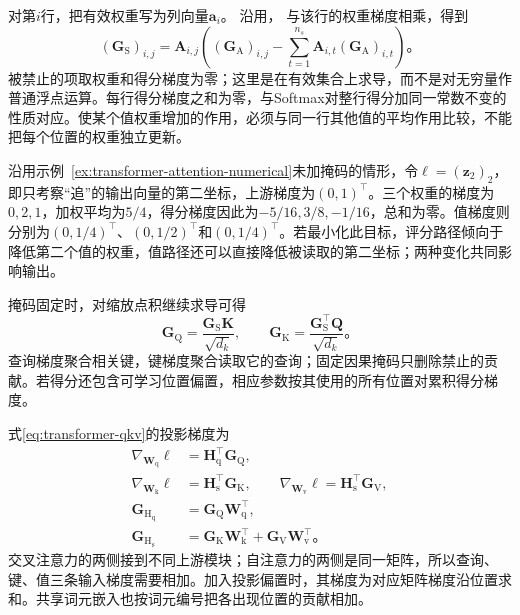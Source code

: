 对第$i$行，把有效权重写为列向量$\bm a_i$。
沿用，
与该行的权重梯度相乘，得到
\begin{equation}
  (\bm G_{\mathrm S})_{i,j}
   =\bm A_{i,j}\left((\bm G_{\mathrm A})_{i,j}
       -\sum_{t=1}^{n_s}\bm A_{i,t}(\bm G_{\mathrm A})_{i,t}\right)\text{。}
  \label{eq:transformer-softmax-gradient}
\end{equation}
被禁止的项取权重和得分梯度为零；这里是在有效集合上求导，而不是对无穷量作普通浮点运算。每行得分梯度之和为零，与Softmax对整行得分加同一常数不变的性质对应。使某个值权重增加的作用，必须与同一行其他值的平均作用比较，不能把每个位置的权重独立更新。

\Needspace{45mm}
\begin{example}[从聚合误差到评分误差]
  \label{ex:transformer-gradient-numerical}
  沿用示例~\ref{ex:transformer-attention-numerical}未加掩码的情形，令$\ell=(\bm z_2)_2$，即只考察“追”的输出向量的第二坐标，上游梯度为$(0,1)^{\top}$。三个权重的梯度为$0,2,1$，加权平均为$5/4$，得分梯度因此为$-5/16,3/8,-1/16$，总和为零。值梯度则分别为$(0,1/4)^{\top}$、$(0,1/2)^{\top}$和$(0,1/4)^{\top}$。若最小化此目标，评分路径倾向于降低第二个值的权重，值路径还可以直接降低被读取的第二坐标；两种变化共同影响输出。
\end{example}

掩码固定时，对缩放点积继续求导可得
\begin{equation}
  \bm G_{\mathrm Q}=\frac{\bm G_{\mathrm S}\bm K}{\sqrt{d_k}},\qquad
  \bm G_{\mathrm K}=\frac{\bm G_{\mathrm S}^{\top}\bm Q}{\sqrt{d_k}}\text{。}
  \label{eq:transformer-qk-gradient}
\end{equation}
查询梯度聚合相关键，键梯度聚合读取它的查询；固定因果掩码只删除禁止的贡献。若得分还包含可学习位置偏置，相应参数按其使用的所有位置对累积得分梯度。

式\eqref{eq:transformer-qkv}的投影梯度为
\begin{equation}
  \begin{aligned}
    \nabla_{\bm W_{\mathrm q}}\ell&=\bm H_{\mathrm q}^{\top}\bm G_{\mathrm Q},\\
    \nabla_{\bm W_{\mathrm k}}\ell&=\bm H_{\mathrm s}^{\top}\bm G_{\mathrm K},\qquad
    \nabla_{\bm W_{\mathrm v}}\ell=\bm H_{\mathrm s}^{\top}\bm G_{\mathrm V},\\
    \bm G_{\mathrm H_{\mathrm q}}&=\bm G_{\mathrm Q}\bm W_{\mathrm q}^{\top},\\
    \bm G_{\mathrm H_{\mathrm s}}&=\bm G_{\mathrm K}\bm W_{\mathrm k}^{\top}
                      +\bm G_{\mathrm V}\bm W_{\mathrm v}^{\top}\text{。}
  \end{aligned}
  \label{eq:transformer-projection-gradient}
\end{equation}
交叉注意力的两侧接到不同上游模块；自注意力的两侧是同一矩阵，所以查询、键、值三条输入梯度需要相加。加入投影偏置时，其梯度为对应矩阵梯度沿位置求和。共享词元嵌入也按词元编号把各出现位置的贡献相加。

